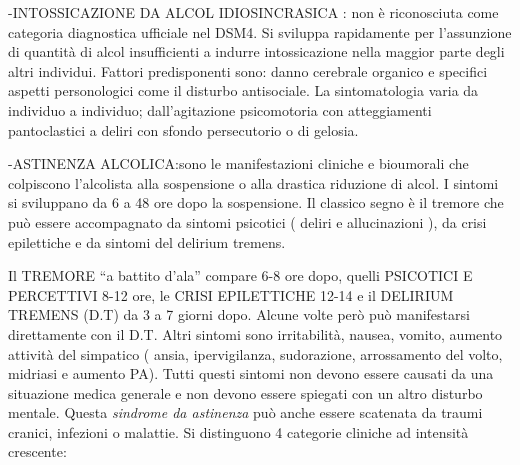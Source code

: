 \documentclass[]{article}
\begin{document}
-INTOSSICAZIONE DA ALCOL IDIOSINCRASICA : non è riconosciuta come
categoria diagnostica ufficiale nel DSM4. Si sviluppa rapidamente per
l'assunzione di quantità di alcol insufficienti a indurre intossicazione
nella maggior parte degli altri individui. Fattori predisponenti sono:
danno cerebrale organico e specifici aspetti personologici come il
disturbo antisociale. La sintomatologia varia da individuo a individuo;
dall'agitazione psicomotoria con atteggiamenti pantoclastici a deliri
con sfondo persecutorio o di gelosia.

-ASTINENZA ALCOLICA:sono le manifestazioni cliniche e bioumorali che
colpiscono l'alcolista alla sospensione o alla drastica riduzione di
alcol. I sintomi si sviluppano da 6 a 48 ore dopo la sospensione. Il
classico segno è il tremore che può essere accompagnato da sintomi
psicotici ( deliri e allucinazioni ), da crisi epilettiche e da sintomi
del delirium tremens.

Il TREMORE ``a battito d'ala'' compare 6-8 ore dopo, quelli PSICOTICI E
PERCETTIVI 8-12 ore, le CRISI EPILETTICHE 12-14 e il DELIRIUM TREMENS
(D.T) da 3 a 7 giorni dopo. Alcune volte però può manifestarsi
direttamente con il D.T. Altri sintomi sono irritabilità, nausea,
vomito, aumento attività del simpatico ( ansia, ipervigilanza,
sudorazione, arrossamento del volto, midriasi e aumento PA). Tutti
questi sintomi non devono essere causati da una situazione medica
generale e non devono essere spiegati con un altro disturbo mentale.
Questa \emph{sindrome da astinenza} può anche essere scatenata da traumi
cranici, infezioni o malattie. Si distinguono 4 categorie cliniche ad
intensità crescente:
\end{document}
